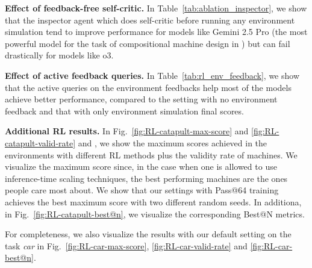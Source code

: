 \textbf{Effect of feedback-free self-critic.} In Table~\ref{tab:ablation_inspector}, we show that the inspector agent which does self-critic before running any environment simulation tend to improve performance for models like Gemini 2.5 Pro (the most powerful model for the task of compositional machine design in \envname) but can fail drastically for models like o3.

\textbf{Effect of active feedback queries.} In Table~\ref{tab:rl_env_feedback}, we show that the active queries on the environment feedbacks help most of the models achieve better performance, compared to the setting with no environment feedback and that with only environment simulation final scores.

\textbf{Additional RL results.} In Fig.~\ref{fig:RL-catapult-max-score} and \ref{fig:RL-catapult-valid-rate} and , we show the maximum scores achieved in the environments with different RL methods plus the validity rate of machines. We visualize the maximum score since, in the case when one is allowed to use inference-time scaling techniques, the best performing machines are the ones people care most about. We show that our settings with Pass@64 training achieves the best maximum score with two different random seeds. In additiona, in Fig.~\ref{fig:RL-catapult-best@n}, we visualize the corresponding Best@N metrics.

For completeness, we also visualize the results with our default setting on the task \textit{car} in Fig.~\ref{fig:RL-car-max-score}, \ref{fig:RL-car-valid-rate} and \ref{fig:RL-car-best@n}.






